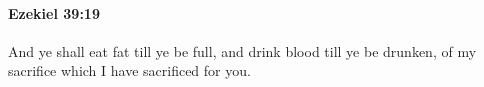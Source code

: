 
		\paragraph{Ezekiel 39:19} %
			\label{EZEKIEL-39-19}

			And ye shall eat fat till ye be full, and drink blood till ye be drunken, of my sacrifice which I have sacrificed for you.


